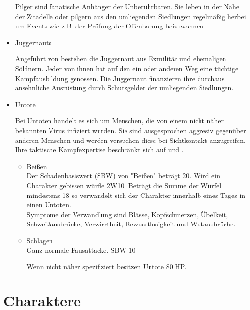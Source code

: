 \begin{itemize}
Pilger sind fanatische Anhänger der Unberührbaren. Sie leben in der Nähe der Zitadelle oder pilgern aus den umliegenden Siedlungen regelmäßig herbei um Events wie z.B. der Prüfung der Offenbarung beizuwohnen.

  \item Juggernauts

Angeführt von  bestehen die Juggernaut aus Exmilitär und ehemaligen Söldnern. Jeder von ihnen hat auf den ein oder anderen Weg eine tüchtige Kampfausbildung genossen. Die Juggernaut finanzieren ihre durchaus ansehnliche Ausrüstung durch Schutzgelder der umliegenden Siedlungen.

  \item Untote

Bei Untoten handelt es sich um Menschen, die von einem nicht näher bekannten Virus infiziert wurden. Sie sind ausgesprochen aggresiv gegenüber anderen Menschen und werden versuchen diese bei Sichtkontakt anzugreifen. Ihre taktische Kampfexpertise beschränkt sich auf  und .

\begin{itemize}
  \item Beißen
  \\Der Schadenbasiswert (SBW) von "Beißen" beträgt 20. Wird ein Charakter gebissen würfle 2W10. Beträgt die Summe der Würfel mindestens 18 so verwandelt sich der Charakter innerhalb eines Tages in einen Untoten.
  \\Symptome der Verwandlung sind Blässe, Kopfschmerzen, Übelkeit, Schweißausbrüche, Verwirrtheit, Bewusstlosigkeit und Wutausbrüche.
  \item Schlagen
  \\Ganz normale Fausattacke. SBW 10

  Wenn nicht näher spezifiziert besitzen Untote 80 HP.

\end{itemize}
\end{itemize}
\newpage
\section{Charaktere}

